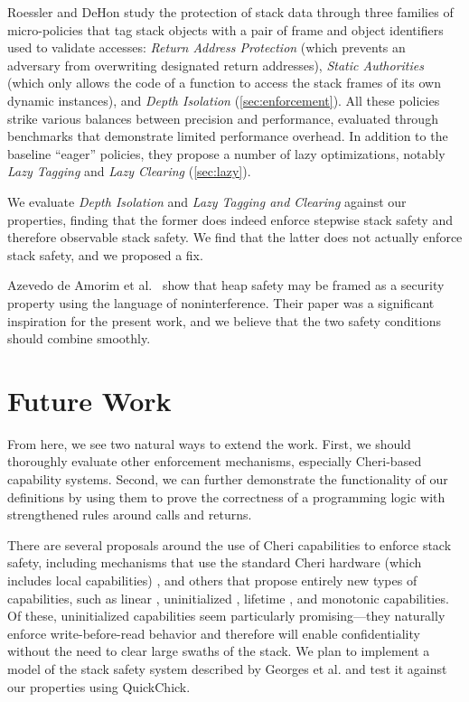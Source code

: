 \documentclass[10pt,conference]{ieeetran}%
\theoremstyle{definition}
\begin{document}
{
%
Roessler and DeHon \cite{DBLP:conf/sp/RoesslerD18}
study the protection of stack data through three families of
micro-policies that tag stack objects with a pair of frame and object identifiers
used to validate accesses: {\em Return Address Protection} (which
prevents an adversary from overwriting designated return addresses), {\em Static
Authorities} (which only allows the code of a function to access the stack frames
of its own dynamic instances), and {\em Depth Isolation}
(\cref{sec:enforcement}). All these policies strike various balances between
precision and performance, evaluated through benchmarks that demonstrate
limited performance overhead. In addition to the baseline ``eager'' policies,
they propose a number of lazy optimizations, notably {\em Lazy Tagging} and
{\em Lazy
Clearing} (\cref{sec:lazy}).

We evaluate {\em Depth Isolation} and {\em Lazy Tagging and Clearing}
against our properties, finding that the former does
indeed enforce stepwise stack safety and therefore observable stack
safety. We find that the latter does not actually enforce
stack safety, and we proposed a fix.

%
Azevedo de Amorim et al.~\cite{DBLP:conf/post/AmorimHP18} show that 
heap safety may be framed as a security property using
the language of noninterference. Their paper was a significant inspiration
for the present work, and we believe that the two safety conditions should
combine smoothly.

\section{Future Work}
\label{sec:future}

From here, we see two natural ways to extend the work. 
First, we should thoroughly evaluate
other enforcement mechanisms, especially Cheri-based capability
systems. Second, we can further demonstrate
the functionality of our definitions by using them to prove
the correctness of a programming logic with strengthened rules around calls and returns.

%
There are several proposals around the use of Cheri capabilities to enforce stack safety,
including mechanisms that use the standard Cheri hardware (which includes local
capabilities) \cite{SkorstengaardLocal},
and others that propose entirely new types of capabilities, such as linear
\cite{SkorstengaardSTK}, uninitialized \cite{Georges+21}, lifetime
\cite{Tsampas+19}, and monotonic \cite{GeorgesComplete} capabilities.
Of these, uninitialized capabilities seem particularly promising---they naturally enforce
write-before-read behavior and therefore will enable confidentiality without the need
to clear large swaths of the stack. We plan to implement a model of the stack safety
system described by Georges et al. \cite{Georges+21} and test it against our properties using
QuickChick.

}
\end{document}
